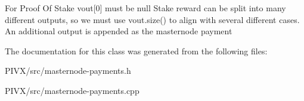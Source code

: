 For Proof Of Stake vout\mbox{[}0\mbox{]} must be null Stake reward can be split into many different outputs, so we must use vout.\+size() to align with several different cases. An additional output is appended as the masternode payment

The documentation for this class was generated from the following files\+:\begin{DoxyCompactItemize}
\item 
P\+I\+V\+X/src/masternode-\/payments.\+h\item 
P\+I\+V\+X/src/masternode-\/payments.\+cpp\end{DoxyCompactItemize}
